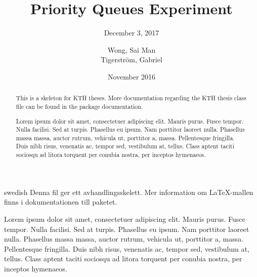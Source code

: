 \documentclass[a4paper,11pt]{kth-mag}
\title{Priority Queues Experiment}
\subtitle{December 3, 2017}
\author{Wong, Sai Man\\ Tigerstr\"{o}m, Gabriel}
\date{November 2016}
\begin{document}
\frontmatter
\pagestyle{empty}
\removepagenumbers
\maketitle
{}

\begin{abstract}
This is a skeleton for KTH theses. More documentation
regarding the KTH thesis class file can be found in
the package documentation.

Lorem ipsum dolor sit amet, consectetuer adipiscing elit. Mauris
purus. Fusce tempor. Nulla facilisi. Sed at turpis. Phasellus eu
ipsum. Nam porttitor laoreet nulla. Phasellus massa massa, auctor
rutrum, vehicula ut, porttitor a, massa. Pellentesque fringilla. Duis
nibh risus, venenatis ac, tempor sed, vestibulum at, tellus. Class
aptent taciti sociosqu ad litora torquent per conubia nostra, per
inceptos hymenaeos.
\end{abstract}
\clearpage

\begin{foreignabstract}{swedish}
Denna fil ger ett avhandlingsskelett.
Mer information om \LaTeX-mallen finns i
dokumentationen till paketet.

Lorem ipsum dolor sit amet, consectetuer adipiscing elit. Mauris
purus. Fusce tempor. Nulla facilisi. Sed at turpis. Phasellus eu
ipsum. Nam porttitor laoreet nulla. Phasellus massa massa, auctor
rutrum, vehicula ut, porttitor a, massa. Pellentesque fringilla. Duis
nibh risus, venenatis ac, tempor sed, vestibulum at, tellus. Class
aptent taciti sociosqu ad litora torquent per conubia nostra, per
inceptos hymenaeos.
\end{foreignabstract}
\clearpage

{
    \hypersetup{linkcolor=black}
    \tableofcontents*
}
\mainmatter
\pagestyle{newchap}
\end{document}
